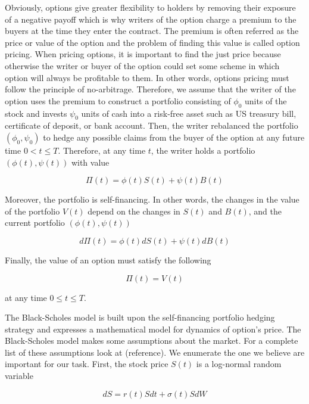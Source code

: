 Obviously, options give greater flexibility 
to holders by removing their exposure of a negative payoff which is why writers of 
the option charge a premium to the buyers at the time they enter the contract. 
The premium is often referred as the price or value of the option and the problem of finding this value is called option pricing. 
When pricing options, it is important to find the just price because 
otherwise the writer or buyer of the option could set some scheme in which option
will always be profitable to them. In other words, options pricing must follow
the principle of no-arbitrage. Therefore, we assume that the writer of the option
uses the premium to construct a portfolio consisting of $\phi_0$ units of the 
stock and invests $\psi_0$ units of cash into a risk-free asset such as US
treasury bill, certificate of deposit, or bank account. Then, the writer rebalanced
the portfolio $(\phi_0, \psi_0)$ to hedge any 
possible claims from the buyer of the option at any future time $0 < t \le T$. 
Therefore, at any time $t$, the writer holds a portfolio $(\phi(t), \psi(t))$ 
with value

\begin{equation}
  \Pi(t) = \phi(t)S(t) + \psi(t)B(t)
\end{equation}

Moreover, the portfolio is self-financing. In other words, the changes in the value
of the portfolio $V(t)$ depend on the changes in $S(t)$ and $B(t)$, and the current
portfolio $(\phi(t), \psi(t))$

\begin{equation}
  d\Pi(t) = \phi(t)dS(t) + \psi(t)dB(t)
\end{equation}

Finally, the value of an option must satisfy the following

\begin{equation}
  \Pi(t) = V(t)
\end{equation}

at any time $0 \le t \le T$.

The Black-Scholes model is built upon the self-financing portfolio hedging strategy 
and expresses a mathematical model for dynamics of option's price. 
The Black-Scholes model makes some assumptions about the market. For a complete
list of these assumptions look at (reference). We enumerate the one we believe 
are important for our task. First, the stock price $S(t)$ is a log-normal random
variable 

\begin{equation}
  dS = r(t)Sdt + \sigma(t) S dW
\end{equation}

